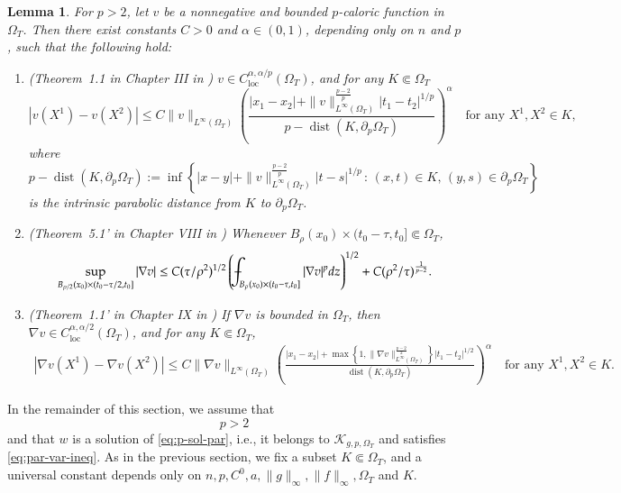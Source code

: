 \documentclass[11pt,oneside,english]{amsart}
\newcommand{\cK}{{\mathcal K}}
\newcommand{\al}{\alpha}
\newcommand{\dist}{\operatorname{dist}}
\newcommand{\loc}{\operatorname{loc}}
\newcommand{\D}{\nabla}
\numberwithin{equation}{section}
\def\Xint#1{\mathchoice
  {\XXint\displaystyle\textstyle{#1}}%
  {\XXint\textstyle\scriptstyle{#1}}%
  {\XXint\scriptstyle\scriptscriptstyle{#1}}%
  {\XXint\scriptscriptstyle\scriptscriptstyle{#1}}%
  \!\int}
\def\XXint#1#2#3{{\setbox0=\hbox{$#1{#2#3}{\int}$}
    \vcenter{\hbox{$#2#3$}}\kern-.5\wd0}}
\def\dashint{\Xint-}
\theoremstyle{plain}
\newtheorem{lemma}{Lemma}
\numberwithin{equation}{section}
\begin{document}
\begin{lemma}
    \label{lem:p-caloric-reg-deg}
    For $p>2$, let $v$ be a nonnegative and bounded $p$-caloric function in $\Omega_T$. Then there exist constants $C>0$ and $\al\in(0,1)$, depending only on $n$ and $p$, such that the following hold:
    \begin{enumerate}    
    \item (Theorem~1.1 in Chapter {\rm III}  in \cite{DiB93}) $v\in C^{\al,\al/p}_{\loc}(\Omega_T)$, and for any $K\Subset\Omega_T$
    $$
    |v(X^1)-v(X^2)|\le C\|v\|_{L^\infty(\Omega_T)}\left(\frac{|x_1-x_2|+\|v\|_{L^\infty(\Omega_T)}^{\frac{p-2}p}|t_1-t_2|^{1/p} }{p-\dist(K,\partial_p\Omega_T) }  \right)^{\al}\quad\text{for any }X^1,X^2\in K,
    $$
    where $p-\dist(K,\partial_p\Omega_T):=\inf\left\{|x-y|+\|v\|_{L^\infty(\Omega_T)}^{\frac{p-2}p}|t-s|^{1/p}\,:\, (x,t)\in K,\, (y,s)\in \partial_p\Omega_T \right\}$ is the intrinsic parabolic distance from $K$ to $\partial_p\Omega_T$.

    \item (Theorem~5.1' in Chapter {\rm VIII} in \cite{DiB93}) Whenever $B_\rho(x_0)\times(t_0-\tau,t_0]\Subset \Omega_T$,
    \begin{align*}
        \sup_{B_{\rho/2}(x_0)\times(t_0-\tau/2,t_0]}|\D v|\le C(\tau/\rho^2)^{1/2}\left(\dashint_{B_{\rho}(x_0)\times(t_0-\tau,t_0]}|\D v|^pdz\right)^{1/2}+C(\rho^2/\tau)^{\frac1{p-2}}.
        \end{align*}
        
    \item (Theorem~1.1' in Chapter {\rm IX} in \cite{DiB93}) If $\D v$ is bounded in $\Omega_T$, then $\D v\in C^{\al,\al/2}_{\loc}(\Omega_T)$, and for any $K\Subset\Omega_T$,
    \begin{align*}
    |\D v(X^1)-\D v(X^2)|\le C\|\D v\|_{L^\infty(\Omega_T)}\left(\frac{|x_1-x_2|+\max\left\{1,\|\D v\|_{L^\infty(\Omega_T)}^{\frac{p-2}2}\right\}|t_1-t_2|^{1/2} }{\dist(K,\partial_p\Omega_T)} \right)^\al\quad\text{for any } X^1,X^2\in K.
    \end{align*}
    \end{enumerate}
\end{lemma}

In the remainder of this section, we assume that 
$$
p>2
$$ 
and that $w$ is a solution of \eqref{eq:p-sol-par}, i.e., it belongs to $\cK_{g,p,\Omega_T}$ and satisfies \eqref{eq:par-var-ineq}. As in the previous section, we fix a subset $K\Subset \Omega_T$, and a universal constant depends only on $n,p,C^0,a,\|g\|_\infty,\|f\|_\infty,\Omega_T$ and $K$.
\end{document}
